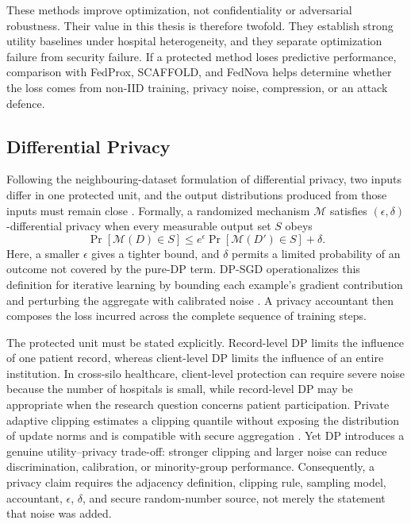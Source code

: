 These methods improve optimization, not confidentiality or adversarial robustness. Their value in this thesis is therefore twofold. They establish strong utility baselines under hospital heterogeneity, and they separate optimization failure from security failure. If a protected method loses predictive performance, comparison with FedProx, SCAFFOLD, and FedNova helps determine whether the loss comes from non-IID training, privacy noise, compression, or an attack defence.

\subsection{Differential Privacy}

Following the neighbouring-dataset formulation of differential privacy, two inputs differ in one protected unit, and the output distributions produced from those inputs must remain close \cite{dwork2006calibrating}. Formally, a randomized mechanism $\mathcal{M}$ satisfies $(\epsilon,\delta)$-differential privacy when every measurable output set $S$ obeys
\begin{equation}
    \Pr[\mathcal{M}(D)\in S]
    \leq e^{\epsilon}\Pr[\mathcal{M}(D')\in S]+\delta.
    \label{eq:dp-definition}
\end{equation}
Here, a smaller $\epsilon$ gives a tighter bound, and $\delta$ permits a limited probability of an outcome not covered by the pure-DP term. DP-SGD operationalizes this definition for iterative learning by bounding each example's gradient contribution and perturbing the aggregate with calibrated noise \cite{abadi2016deep}. A privacy accountant then composes the loss incurred across the complete sequence of training steps.

The protected unit must be stated explicitly. Record-level DP limits the influence of one patient record, whereas client-level DP limits the influence of an entire institution. In cross-silo healthcare, client-level protection can require severe noise because the number of hospitals is small, while record-level DP may be appropriate when the research question concerns patient participation. Private adaptive clipping estimates a clipping quantile without exposing the distribution of update norms and is compatible with secure aggregation \cite{andrew2021adaptive}. Yet DP introduces a genuine utility--privacy trade-off: stronger clipping and larger noise can reduce discrimination, calibration, or minority-group performance. Consequently, a privacy claim requires the adjacency definition, clipping rule, sampling model, accountant, $\epsilon$, $\delta$, and secure random-number source, not merely the statement that noise was added.

